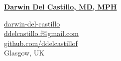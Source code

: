 \noindent
\begin{minipage}[c]{0.45\textwidth}
{\huge\underline{\textbf{Darwin Del Castillo, MD, MPH}}}
\end{minipage}%
\hfill
\begin{minipage}[c]{0.50\textwidth}
\raggedleft\large
\faLinkedin\hspace{0.4em}\href{https://www.linkedin.com/in/darwin-del-castillo/}{darwin-del-castillo} \\[2pt]
\faEnvelope\hspace{0.4em}\href{mailto:ddelcastillo.f@gmail.com}{ddelcastillo.f@gmail.com} \\[2pt]
\faGithub\hspace{0.4em}\href{https://github.com/ddelcastillof}{github.com/ddelcastillof} \\[2pt]
\faMapMarker*\hspace{0.4em}Glasgow, UK
\end{minipage}
\vspace{4pt}
